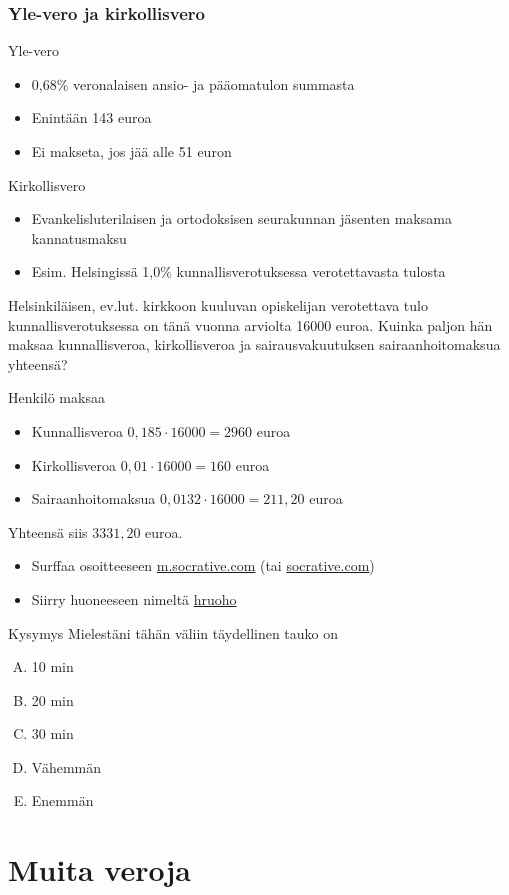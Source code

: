 \documentclass{beamer}
\newcommand{\socrativeOhje}{
\begin{itemize}
\item Surffaa osoitteeseen \url{m.socrative.com} (tai \url{socrative.com})
\item Siirry huoneeseen nimeltä \url{hruoho}
\end{itemize}
}
\newcommand{\taukoKysymys}{
\socrativeOhje
	\begin{block}{Kysymys}
	Mielestäni tähän väliin täydellinen tauko on
	\begin{enumerate}[(A)]
		\item 10 min
		\item 20 min
		\item 30 min
		\item Vähemmän 
		\item Enemmän
	\end{enumerate}	
	\end{block}
}
\begin{document}
\begin{frame}
\frametitle{Yle-vero ja kirkollisvero}
\begin{block}{Yle-vero}
	\begin{itemize}
		\item 0,68\% veronalaisen ansio- ja pääomatulon summasta
		\item Enintään 143 euroa
		\item Ei makseta, jos jää alle 51 euron
	\end{itemize}
\end{block}
\pause
\begin{block}{Kirkollisvero}
	\begin{itemize}
		\item Evankelisluterilaisen ja ortodoksisen seurakunnan jäsenten maksama kannatusmaksu
		\item Esim. Helsingissä 1,0\% kunnallisverotuksessa verotettavasta tulosta
	\end{itemize}
\end{block}
\end{frame}

\begin{frame}
	\begin{esim}
		Helsinkiläisen, ev.lut. kirkkoon kuuluvan opiskelijan verotettava tulo kunnallisverotuksessa on tänä vuonna arviolta 16000 euroa. Kuinka paljon hän maksaa kunnallisveroa, kirkollisveroa ja sairausvakuutuksen sairaanhoitomaksua yhteensä?
	\end{esim}
	\begin{ratkaisu}
		Henkilö maksaa
		\begin{itemize}
			\item Kunnallisveroa \pause \(0,185\cdot16000 = 2960\) euroa \pause
			\item Kirkollisveroa \pause \(0,01\cdot 16000 = 160\) euroa\pause
			\item Sairaanhoitomaksua \pause \(0,0132\cdot 16000 = 211,20\) euroa
		\end{itemize}
		\pause Yhteensä siis \(3331,20\) euroa.
	\end{ratkaisu}
\end{frame}

\begin{frame}
\taukoKysymys
\end{frame}

\section{Muita veroja}
\end{document}
